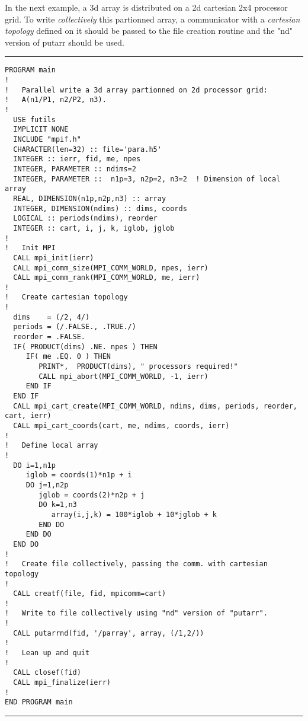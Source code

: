 \documentclass[a4paper]{article}
\begin{document}
In the next example, a 3d array is distributed on a 2d cartesian 2x4
processor grid. To write {\itshape collectively\/} this partionned array,
a communicator with a {\itshape cartesian topology\/} defined on it should be passed to
the file creation routine and the "nd" version of {\ttfamily putarr} should
be used.
\par
\addvspace{\medskipamount}
\nopagebreak\hrule
\begin{verbatim}
PROGRAM main
!
!   Parallel write a 3d array partionned on 2d processor grid:
!   A(n1/P1, n2/P2, n3).
!
  USE futils
  IMPLICIT NONE
  INCLUDE "mpif.h"
  CHARACTER(len=32) :: file='para.h5'
  INTEGER :: ierr, fid, me, npes
  INTEGER, PARAMETER :: ndims=2
  INTEGER, PARAMETER ::  n1p=3, n2p=2, n3=2  ! Dimension of local array
  REAL, DIMENSION(n1p,n2p,n3) :: array
  INTEGER, DIMENSION(ndims) :: dims, coords
  LOGICAL :: periods(ndims), reorder
  INTEGER :: cart, i, j, k, iglob, jglob
!
!   Init MPI
  CALL mpi_init(ierr)
  CALL mpi_comm_size(MPI_COMM_WORLD, npes, ierr)
  CALL mpi_comm_rank(MPI_COMM_WORLD, me, ierr)
!
!   Create cartesian topology
!
  dims    = (/2, 4/)
  periods = (/.FALSE., .TRUE./)
  reorder = .FALSE.
  IF( PRODUCT(dims) .NE. npes ) THEN
     IF( me .EQ. 0 ) THEN
        PRINT*,  PRODUCT(dims), " processors required!"
        CALL mpi_abort(MPI_COMM_WORLD, -1, ierr)
     END IF
  END IF
  CALL mpi_cart_create(MPI_COMM_WORLD, ndims, dims, periods, reorder, cart, ierr)
  CALL mpi_cart_coords(cart, me, ndims, coords, ierr)
!
!   Define local array
!
  DO i=1,n1p
     iglob = coords(1)*n1p + i
     DO j=1,n2p
        jglob = coords(2)*n2p + j
        DO k=1,n3
           array(i,j,k) = 100*iglob + 10*jglob + k
        END DO
     END DO
  END DO
!
!   Create file collectively, passing the comm. with cartesian topology
!
  CALL creatf(file, fid, mpicomm=cart)
!
!   Write to file collectively using "nd" version of "putarr".
!
  CALL putarrnd(fid, '/parray', array, (/1,2/))
!
!   Lean up and quit
!
  CALL closef(fid)
  CALL mpi_finalize(ierr)
!
END PROGRAM main
\end{verbatim}
\nopagebreak\hrule
\addvspace{\medskipamount}
\end{document}
